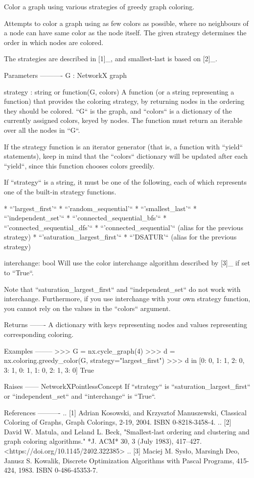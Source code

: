 \begin{DoxyVerb}Color a graph using various strategies of greedy graph coloring.

Attempts to color a graph using as few colors as possible, where no
neighbours of a node can have same color as the node itself. The
given strategy determines the order in which nodes are colored.

The strategies are described in [1]_, and smallest-last is based on
[2]_.

Parameters
----------
G : NetworkX graph

strategy : string or function(G, colors)
   A function (or a string representing a function) that provides
   the coloring strategy, by returning nodes in the ordering they
   should be colored. ``G`` is the graph, and ``colors`` is a
   dictionary of the currently assigned colors, keyed by nodes. The
   function must return an iterable over all the nodes in ``G``.

   If the strategy function is an iterator generator (that is, a
   function with ``yield`` statements), keep in mind that the
   ``colors`` dictionary will be updated after each ``yield``, since
   this function chooses colors greedily.

   If ``strategy`` is a string, it must be one of the following,
   each of which represents one of the built-in strategy functions.

   * ``'largest_first'``
   * ``'random_sequential'``
   * ``'smallest_last'``
   * ``'independent_set'``
   * ``'connected_sequential_bfs'``
   * ``'connected_sequential_dfs'``
   * ``'connected_sequential'`` (alias for the previous strategy)
   * ``'saturation_largest_first'``
   * ``'DSATUR'`` (alias for the previous strategy)

interchange: bool
   Will use the color interchange algorithm described by [3]_ if set
   to ``True``.

   Note that ``saturation_largest_first`` and ``independent_set``
   do not work with interchange. Furthermore, if you use
   interchange with your own strategy function, you cannot rely
   on the values in the ``colors`` argument.

Returns
-------
A dictionary with keys representing nodes and values representing
corresponding coloring.

Examples
--------
>>> G = nx.cycle_graph(4)
>>> d = nx.coloring.greedy_color(G, strategy="largest_first")
>>> d in [{0: 0, 1: 1, 2: 0, 3: 1}, {0: 1, 1: 0, 2: 1, 3: 0}]
True

Raises
------
NetworkXPointlessConcept
    If ``strategy`` is ``saturation_largest_first`` or
    ``independent_set`` and ``interchange`` is ``True``.

References
----------
.. [1] Adrian Kosowski, and Krzysztof Manuszewski,
   Classical Coloring of Graphs, Graph Colorings, 2-19, 2004.
   ISBN 0-8218-3458-4.
.. [2] David W. Matula, and Leland L. Beck, "Smallest-last
   ordering and clustering and graph coloring algorithms." *J. ACM* 30,
   3 (July 1983), 417–427. <https://doi.org/10.1145/2402.322385>
.. [3] Maciej M. Sysło, Marsingh Deo, Janusz S. Kowalik,
   Discrete Optimization Algorithms with Pascal Programs, 415-424, 1983.
   ISBN 0-486-45353-7.\end{DoxyVerb}
